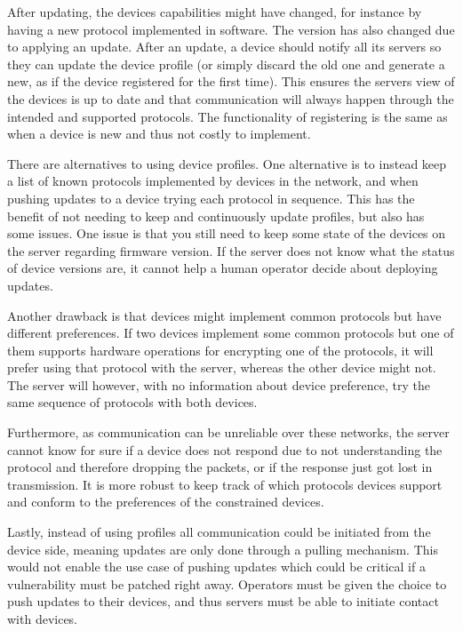\documentclass[0-thesis.tex]{subfiles}
\begin{document}
After updating, the devices capabilities might have changed, for instance by having a new
protocol implemented in software. The version has also changed due to applying an update.
After an update, a device should notify all its servers so they can update the device
profile (or simply discard the old one and generate a new, as if the device registered for
the first time). This ensures the servers view of the devices is up to date and that
communication will always happen through the intended and supported protocols. The
functionality of registering is the same as when a device is new and thus not costly to
implement.

There are alternatives to using device profiles. One alternative is to instead keep a list
of known protocols implemented by devices in the network, and when pushing updates to a
device trying each protocol in sequence. This has the benefit of not needing to keep and
continuously update profiles, but also has some issues. One issue is that you still need
to keep some state of the devices on the server regarding firmware version. If the server
does not know what the status of device versions are, it cannot help a human operator
decide about deploying updates. 

Another drawback is that devices might implement common protocols but have different
preferences. If two devices implement some common protocols but one of them supports
hardware operations for encrypting one of the protocols, it will prefer using that
protocol with the server, whereas the other device might not. The server will however,
with no information about device preference, try the same sequence of protocols with both
devices.

Furthermore, as communication can be unreliable over these networks, the server
cannot know for sure if a device does not respond due to not understanding the protocol
and therefore dropping the packets, or if the response just got lost in transmission. It
is more robust to keep track of which protocols devices support and conform to the
preferences of the constrained devices.

Lastly, instead of using profiles all communication could be initiated from the device
side, meaning updates are only done through a pulling mechanism. This would not enable the
use case of pushing updates which could be critical if a vulnerability must be patched
right away. Operators must be given the choice to push updates to their devices, and thus
servers must be able to initiate contact with devices.
\end{document}
